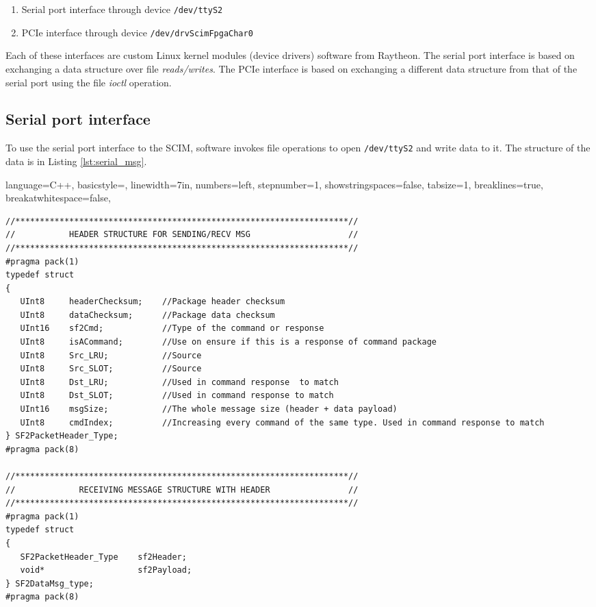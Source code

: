 \documentclass[12pt]{article}
\begin{document}
\begin{enumerate}
    \item Serial port interface through device \texttt{/dev/ttyS2}
    \item PCIe interface through device \texttt{/dev/drvScimFpgaChar0}
\end{enumerate}


Each of these interfaces are custom Linux kernel modules (device drivers) software from
Raytheon.
The serial port interface is based on exchanging a data structure over file \emph{reads/writes}.
The PCIe interface is based on exchanging a different data structure from that of the serial port using the file \emph{ioctl} operation.

\subsection{Serial port interface}

To use the serial port interface to the SCIM, software invokes file operations to open \texttt{/dev/ttyS2} and write data to it. The structure
of the data is in Listing \ref{lst:serial_msg}.

\lstset
{
    language=C++,
    basicstyle=\footnotesize\ttfamily,
    linewidth=7in,
    numbers=left,
    stepnumber=1,
    showstringspaces=false,
    tabsize=1,
    breaklines=true,
    breakatwhitespace=false,
}

\begin{adjustwidth}{0.0in}{0.0in}
\begin{lstlisting}[firstnumber=143, caption={\texttt{exeCswBoot/SerialCommonTypes.h} Serial Port message (variable length)}, label={lst:serial_msg}]
//********************************************************************//
//           HEADER STRUCTURE FOR SENDING/RECV MSG                    //
//********************************************************************//
#pragma pack(1)
typedef struct
{
   UInt8     headerChecksum;    //Package header checksum
   UInt8     dataChecksum;      //Package data checksum
   UInt16    sf2Cmd;            //Type of the command or response
   UInt8     isACommand;        //Use on ensure if this is a response of command package
   UInt8     Src_LRU;           //Source
   UInt8     Src_SLOT;          //Source
   UInt8     Dst_LRU;           //Used in command response  to match
   UInt8     Dst_SLOT;          //Used in command response to match
   UInt16    msgSize;           //The whole message size (header + data payload)
   UInt8     cmdIndex;          //Increasing every command of the same type. Used in command response to match
} SF2PacketHeader_Type;
#pragma pack(8)

//********************************************************************//
//             RECEIVING MESSAGE STRUCTURE WITH HEADER                //
//********************************************************************//
#pragma pack(1)
typedef struct
{
   SF2PacketHeader_Type    sf2Header;
   void*                   sf2Payload;
} SF2DataMsg_type;
#pragma pack(8)

\end{lstlisting}
\end{adjustwidth}
\end{document}

